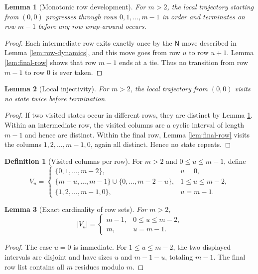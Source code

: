\documentclass[11pt]{article}
\newtheorem{lemma}{Lemma}
\theoremstyle{definition}
\newtheorem{definition}{Definition}
\theoremstyle{remark}
\newcommand{\NN}{\mathsf{N}}
\begin{document}
\begin{lemma}[Monotonic row development]\label{lem:monotone-row}
For $m>2$, the local trajectory starting from $(0,0)$ progresses through rows $0,1,\dots,m-1$ in order and terminates on row $m-1$ before any row wrap-around occurs.
\end{lemma}
\begin{proof}
Each intermediate row exits exactly once by the $\NN$ move described in Lemma \ref{lem:row-dynamics}, and this move goes from row $u$ to row $u+1$. Lemma \ref{lem:final-row} shows that row $m-1$ ends at a tie. Thus no transition from row $m-1$ to row $0$ is ever taken.
\end{proof}

\begin{lemma}[Local injectivity]\label{lem:local-injective}
For $m>2$, the local trajectory from $(0,0)$ visits no state twice before termination.
\end{lemma}
\begin{proof}
If two visited states occur in different rows, they are distinct by Lemma \ref{lem:monotone-row}. Within an intermediate row, the visited columns are a cyclic interval of length $m-1$ and hence are distinct. Within the final row, Lemma \ref{lem:final-row} visits the columns $1,2,\dots,m-1,0$, again all distinct. Hence no state repeats.
\end{proof}

\begin{definition}[Visited columns per row]
For $m>2$ and $0\le u\le m-1$, define
\[
V_u=
\begin{cases}
\{0,1,\dots,m-2\}, & u=0,\\
\{m-u,\dots,m-1\}\cup\{0,\dots,m-2-u\}, & 1\le u\le m-2,\\
\{1,2,\dots,m-1,0\}, & u=m-1.
\end{cases}
\]
\end{definition}

\begin{lemma}[Exact cardinality of row sets]\label{lem:row-cardinality}
For $m>2$,
\[
|V_u|=
\begin{cases}
m-1, & 0\le u\le m-2,\\
m, & u=m-1.
\end{cases}
\]
\end{lemma}
\begin{proof}
The case $u=0$ is immediate. For $1\le u\le m-2$, the two displayed intervals are disjoint and have sizes $u$ and $m-1-u$, totaling $m-1$. The final row list contains all $m$ residues modulo $m$.
\end{proof}
\end{document}
